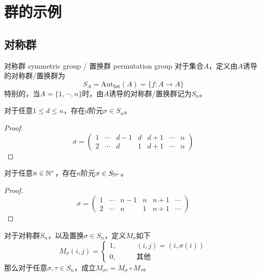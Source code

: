 \section{群的示例}

\subsection{对称群}

\begin{definition}{对称群 symmetric group / 置换群 permutation group}
	对于集合$A$，定义由$A$诱导的对称群/置换群为
	$$
	S_A=\mathrm{Aut}_{\mathsf{Set}}(A)=\{ f:A\to A \}
	$$
	特别的，当$A=\{ 1,\cdots,n \}$时，由$A$诱导的对称群/置换群记为$S_n$。
\end{definition}

\begin{problem}
	对于任意$1\le d\le n$，存在$d$阶元$\sigma\in S_n$。
\end{problem}

\begin{proof}
	$$
	\sigma=\begin{pmatrix}
		1&\cdots& d-1 &d&d+1&\cdots& n\\
		2&\cdots& d &1&d+1&\cdots& n
	\end{pmatrix}
	$$
\end{proof}

\begin{problem}
	对于任意$n\in \mathbb{N}^*$，存在$n$阶元$\sigma\in S_{\mathbb{N}^*}$。
\end{problem}

\begin{proof}
	$$
	\sigma=\begin{pmatrix}
		1&\cdots& n-1 &n&n+1&\cdots\\
		2&\cdots& n &1&n+1&\cdots
	\end{pmatrix}
	$$
\end{proof}

\begin{proposition}
	对于对称群$S_n$，以及置换$\sigma\in S_n$，定义$M_\sigma$如下
	$$
	M_\sigma(i,j)=\begin{cases}
		1,\qquad & (i,j)=(i,\sigma(i))\\
		0,\qquad & \text{其他}
	\end{cases}
	$$
	那么对于任意$\sigma,\tau\in S_n$，成立$M_{\sigma\tau}=M_\sigma\circ M_\tau$。
\end{proposition}

